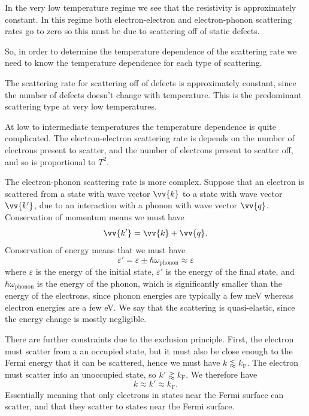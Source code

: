 \documentclass[fleqn]{NotesClass}
\newcommand*{\fermi}{\mathrm{F}}
\begin{document}
    In the very low temperature regime we see that the resistivity is approximately constant.
    In this regime both electron-electron and electron-phonon scattering rates go to zero so this must be due to scattering off of static defects.
    
    So, in order to determine the temperature dependence of the scattering rate we need to know the temperature dependence for each type of scattering.
    
    The scattering rate for scattering off of defects is approximately constant, since the number of defects doesn't change with temperature.
    This is the predominant scattering type at very low temperatures.
    
    At low to intermediate temperatures the temperature dependence is quite complicated.
    The electron-electron scattering rate is depends on the number of electrons present to scatter, and the number of electrons present to scatter off, and so is proportional to \(T^2\).
    
    The electron-phonon scattering rate is more complex.
    Suppose that an electron is scattered from a state with wave vector \(\vv{k}\) to a state with wave vector \(\vv{k'}\), due to an interaction with a phonon with wave vector \(\vv{q}\).
    Conservation of momentum means we must have
    \begin{equation}
        \vv{k'} = \vv{k} + \vv{q}.
    \end{equation}
    Conservation of energy means that we must have
    \begin{equation}
        \varepsilon' = \varepsilon \pm \hbar \omega_{\text{phonon}} \approx \varepsilon
    \end{equation}
    where \(\varepsilon\)  is the energy of the initial state, \(\varepsilon'\) is the energy of the final state, and \(\hbar\omega_{\text{phonon}}\) is the energy of the phonon, which is significantly smaller than the energy of the electrons, since phonon energies are typically a few \unit{\milli\electronvolt} whereas electron energies are a few \unit{\electronvolt}.
    We say that the scattering is quasi-elastic, since the energy change is mostly negligible.
    
    There are further constraints due to the exclusion principle.
    First, the electron must scatter from a an occupied state, but it must also be close enough to the Fermi energy that it can be scattered, hence we must have \(k \lessapprox k_{\fermi}\).
    The electron must scatter into an unoccupied state, so \(k' \gtrapprox k_{\fermi}\).
    We therefore have
    \begin{equation}
        k \approx k' \approx k_{\fermi}.
    \end{equation}
    Essentially meaning that only electrons in states near the Fermi surface can scatter, and that they scatter to states near the Fermi surface.
    
\end{document}
